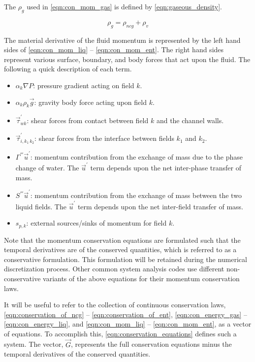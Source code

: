 The $\rho_g$ used in \eqref{eqn:con_mom_gas} is defined by \eqref{eqn:gaseous_density}.

\begin{equation}
\label{eqn:gaseous_density}
\rho_g = \rho_{ncg} + \rho_v
\end{equation}

The material derivative of the fluid momentum is represented by the left hand sides of \eqref{eqn:con_mom_liq} -- \eqref{eqn:con_mom_ent}.
The right hand sides represent various surface, boundary, and body forces that act upon the fluid.
The following a quick description of each term.

\begin{itemize}
\item{
$\alpha_k \nabla P$:
pressure gradient acting on field $k$.
}
\item{
$\alpha_k \rho_k \vec{g}$:
gravity body force acting upon field $k$.
}
\item{
$\vec{\tau}^{'}_{wk}$:
 shear forces from contact between field $k$ and the channel walls. 
}
\item{
$\vec{\tau}^{'}_{i,k_1\,k_2}$:
 shear forces from the interface between fields $k_1$ and $k_2$. 
}
\item{
$\Gamma^{'''}\vec{u}^{'}$:
 momentum contribution from the exchange of mass due to the phase change of water.
 The $\vec{u}^{'}$ term depends upon the net inter-phase transfer of mass.
}
\item{
$S^{'''}\vec{u}^{'}$:
 momentum contribution from the exchange of mass between the two liquid fields.
 The $\vec{u}^{'}$ term depends upon the net inter-field transfer of mass.
}
\item{
$s_{p,k}$:
 external sources/sinks of momentum for field $k$.
}
\end{itemize}

Note that the momentum conservation equations are formulated such that the temporal derivatives are of the conserved quantities, which is referred to as a conservative formulation.
This formulation will be retained during the numerical discretization process.
Other common system analysis codes \cite{TRACE, RELAP} use different non-conservative variants of the above equations for their momentum conservation laws.

It will be useful to refer to the collection of continuous conservation laws, \eqref{eqn:conservation_of_ncg} -- \eqref{eqn:conservation_of_ent}, \eqref{eqn:con_energy_gas} -- \eqref{eqn:con_energy_liq}, and \eqref{eqn:con_mom_liq} -- \eqref{eqn:con_mom_ent}, as a vector of equations.
To accomplish this, \eqref{eqn:conservation_equations} defines such a system.
The vector, $\vec{G}$, represents the full conservation equations minus the temporal derivatives of the conserved quantities.

